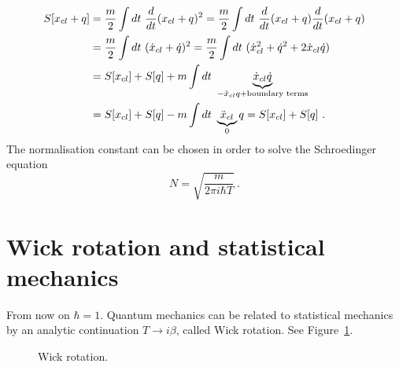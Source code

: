 \begin{example}
        \begin{equation*}
        \begin{aligned}
            S[x_{cl} + q] & = \frac{m}{2} \int dt ~ \frac{d}{dt} (x_{cl} + q)^2 =  \frac{m}{2} \int dt ~ \frac{d}{dt} (x_{cl} + q) \frac{d}{dt} (x_{cl} + q) \\ & = \frac{m}{2} \int dt ~ (\dot x_{cl} + \dot q )^2 = \frac{m}{2} \int dt ~ (\dot x_{cl}^2 + \dot q^2 + 2 \dot x_{cl} \dot q) \\ & = S[x_{cl}] + S[q] + m \int dt ~ \underbrace{\dot x_{cl} \dot q}_{- \ddot x_{cl} q + \text{boundary terms}} \\ & = S[x_{cl}] + S[q] - m \int dt ~ \underbrace{\ddot x_{cl}}_0 q = S[x_{cl}] + S[q] ~.
        \end{aligned}
        \end{equation*}
        The normalisation constant can be chosen in order to solve the Schroedinger equation 
        \begin{equation*}
            N = \sqrt{\frac{m}{2 \pi i \hbar T}} ~.
        \end{equation*}
    \end{example}

\section{Wick rotation and statistical mechanics} 

    From now on $\hbar = 1$. Quantum mechanics can be related to statistical mechanics by an analytic continuation $T \rightarrow i \beta$, called Wick rotation. See Figure~\ref{fig:b:wick}. 
    
    \begin{figure}[h!]
        \centering
        \caption{Wick rotation.}
        \label{fig:b:wick}
    \end{figure}
    
